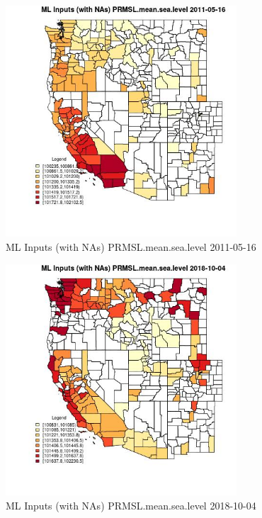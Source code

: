 \begin{figure} 
\centering  
\includegraphics[width=0.77\textwidth]{Code_Outputs/Report_ML_input_PM25_Step4_part_f_de_duplicated_aveswNAs_CountyPRMSLmeansealevelMean2011-05-16.jpg} 
\caption{\label{fig:Report_ML_input_PM25_Step4_part_f_de_duplicated_aveswNAsCountyPRMSLmeansealevelMean2011-05-16}ML Inputs (with NAs) PRMSL.mean.sea.level 2011-05-16} 
\end{figure} 
 

\clearpage 

\begin{figure} 
\centering  
\includegraphics[width=0.77\textwidth]{Code_Outputs/Report_ML_input_PM25_Step4_part_f_de_duplicated_aveswNAs_CountyPRMSLmeansealevelMean2018-10-04.jpg} 
\caption{\label{fig:Report_ML_input_PM25_Step4_part_f_de_duplicated_aveswNAsCountyPRMSLmeansealevelMean2018-10-04}ML Inputs (with NAs) PRMSL.mean.sea.level 2018-10-04} 
\end{figure} 
 

